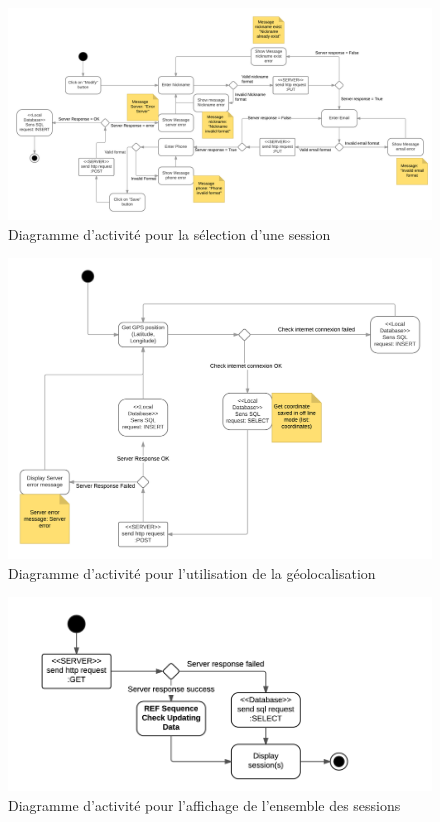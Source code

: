 \documentclass[titlepage, 12pt]{report}
\begin{document}
\begin{figure}[!h]
	\caption{Diagramme d'activité pour la sélection d'une session}
	\label{selection_session_activity_diagram}
	\centering
	\includegraphics[scale=0.6]{Images/diagram/modify_profil_activity_diagram.png}
\end{figure}

\begin{figure}[!h]
	\caption{Diagramme d'activité pour l'utilisation de la géolocalisation}
	\label{use_geolocalistion_activity_diagram}
	\centering
	\includegraphics[scale=0.6]{Images/diagram/use_geolocalisation_activity_diagram.png}
\end{figure}

\begin{figure}[!h]
	\caption{Diagramme d'activité pour l'affichage de l'ensemble des sessions}
	\label{view_sessions_activity_diagram}
	\centering
	\includegraphics[scale=0.6]{Images/diagram/view_sessions_activity_diagram.png}
\end{figure}
\end{document}
